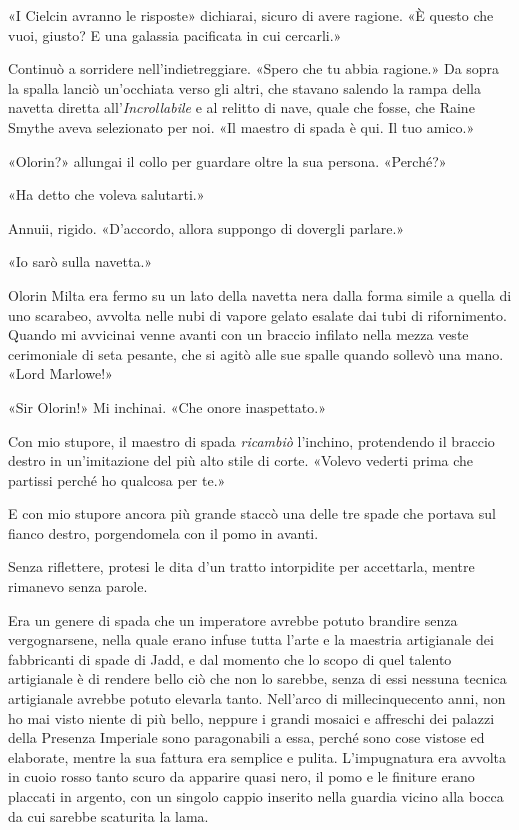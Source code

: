 «I Cielcin avranno le risposte» dichiarai, sicuro di avere ragione. «È
questo che vuoi, giusto? E una galassia pacificata in cui cercarli.»

Continuò a sorridere nell'indietreggiare. «Spero che tu abbia ragione.»
Da sopra la spalla lanciò un'occhiata verso gli altri, che stavano
salendo la rampa della navetta diretta all'\emph{Incrollabile} e al
relitto di nave, quale che fosse, che Raine Smythe aveva selezionato per
noi. «Il maestro di spada è qui. Il tuo amico.»

«Olorin?» allungai il collo per guardare oltre la sua persona. «Perché?»

«Ha detto che voleva salutarti.»

Annuii, rigido. «D'accordo, allora suppongo di dovergli parlare.»

«Io sarò sulla navetta.»

Olorin Milta era fermo su un lato della navetta nera dalla forma simile
a quella di uno scarabeo, avvolta nelle nubi di vapore gelato esalate
dai tubi di rifornimento. Quando mi avvicinai venne avanti con un
braccio infilato nella mezza veste cerimoniale di seta pesante, che si
agitò alle sue spalle quando sollevò una mano. «Lord Marlowe!»

«Sir Olorin!» Mi inchinai. «Che onore inaspettato.»

Con mio stupore, il maestro di spada \emph{ricambiò} l'inchino,
protendendo il braccio destro in un'imitazione del più alto stile di
corte. «Volevo vederti prima che partissi perché ho qualcosa per te.»

E con mio stupore ancora più grande staccò una delle tre spade che
portava sul fianco destro, porgendomela con il pomo in avanti.

Senza riflettere, protesi le dita d'un tratto intorpidite per
accettarla, mentre rimanevo senza parole.

Era un genere di spada che un imperatore avrebbe potuto brandire senza
vergognarsene, nella quale erano infuse tutta l'arte e la maestria
artigianale dei fabbricanti di spade di Jadd, e dal momento che lo scopo
di quel talento artigianale è di rendere bello ciò che non lo sarebbe,
senza di essi nessuna tecnica artigianale avrebbe potuto elevarla tanto.
Nell'arco di millecinquecento anni, non ho mai visto niente di più
bello, neppure i grandi mosaici e affreschi dei palazzi della Presenza
Imperiale sono paragonabili a essa, perché sono cose vistose ed
elaborate, mentre la sua fattura era semplice e pulita. L'impugnatura
era avvolta in cuoio rosso tanto scuro da apparire quasi nero, il pomo e
le finiture erano placcati in argento, con un singolo cappio inserito
nella guardia vicino alla bocca da cui sarebbe scaturita la lama.

